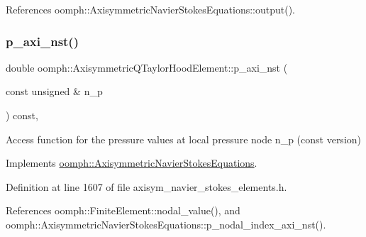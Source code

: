 References oomph\+::\+Axisymmetric\+Navier\+Stokes\+Equations\+::output().

\mbox{\label{classoomph_1_1AxisymmetricQTaylorHoodElement_aec113045099e51a61a1624b0126a05b1}} 
\subsubsection{\texorpdfstring{p\+\_\+axi\+\_\+nst()}{p\_axi\_nst()}}
{\footnotesize\ttfamily double oomph\+::\+Axisymmetric\+Q\+Taylor\+Hood\+Element\+::p\+\_\+axi\+\_\+nst (\begin{DoxyParamCaption}\item[{const unsigned \&}]{n\+\_\+p }\end{DoxyParamCaption}) const\hspace{0.3cm}{\ttfamily [inline]}, {\ttfamily [virtual]}}



Access function for the pressure values at local pressure node n\+\_\+p (const version) 



Implements \hyperlink{classoomph_1_1AxisymmetricNavierStokesEquations_a3aa173227f477a40fb4adba84a337f5b}{oomph\+::\+Axisymmetric\+Navier\+Stokes\+Equations}.



Definition at line 1607 of file axisym\+\_\+navier\+\_\+stokes\+\_\+elements.\+h.



References oomph\+::\+Finite\+Element\+::nodal\+\_\+value(), and oomph\+::\+Axisymmetric\+Navier\+Stokes\+Equations\+::p\+\_\+nodal\+\_\+index\+\_\+axi\+\_\+nst().

\mbox{\label{classoomph_1_1AxisymmetricQTaylorHoodElement_a5593ee69e94a15cca6f309bb38717913}} 
